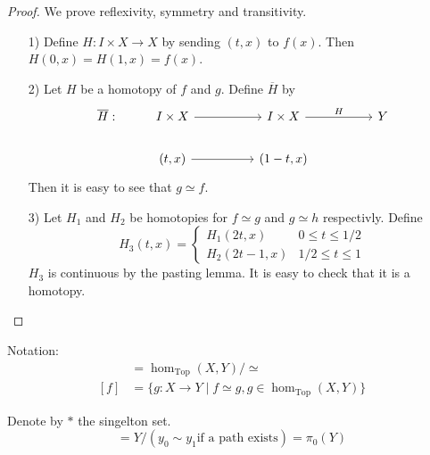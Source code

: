 \begin{proof} We prove reflexivity, symmetry and transitivity.
    \begin{enumerate}
      \item[1)] Define \( H: I \times X \to X \) by sending
        \( (t, x) \) to \( f(x) \).
        Then \( H(0, x) = H(1,x) = f(x) \).
      \item[2)] Let \( H \) be a homotopy of \( f \) and \( g \).
        Define \( \overline{H} \) by
\[\begin{tikzcd}
	{\overline{H}:} & {I \times X} && {I \times X} && Y \\
	& {(t, x)} && {(1-t, x)}
	\arrow[from=1-2, to=1-4]
	\arrow["H", from=1-4, to=1-6]
	\arrow[from=2-2, to=2-4]
\end{tikzcd}\]
Then it is easy to see that \( g \simeq f \).
      \item[3)] Let \( H_1 \) and \( H_2 \) be homotopies
        for \( f \simeq g \) and \( g \simeq h \) respectivly.
        Define
        \begin{equation}
            H_3(t, x) = \begin{cases}
              H_1(2t, x) & 0 \le t \le 1/2 \\
              H_2(2t-1, x) & 1/2 \le t \le 1
            \end{cases}
        \end{equation}
        \( H_3 \) is continuous by the pasting lemma.
        It is easy to check that it is a homotopy.
    \end{enumerate}
\end{proof}

\begin{definition}
    Notation:
    \begin{align}
      [X, Y] &= \hom_{\text{Top}} ( X, Y) / \simeq \\
      [f] &= \{ g: X \to Y \mid f \simeq g, g \in \hom_{\text{Top}} ( X, Y) \}
    \end{align}
\end{definition}

\begin{definition}
    Denote by \( * \) the singelton set.
    \begin{equation}
      [*, Y] = Y / (y_0 \sim y_1 \text{if a path exists}) = \pi_0(Y)
    \end{equation}
\end{definition}


